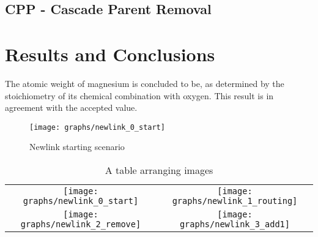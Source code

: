 \documentclass{article}
\begin{document}
\subsection{CPP - Cascade Parent Removal}


\section{Results and Conclusions}

The atomic weight of magnesium is concluded to be, as determined by the stoichiometry of its chemical combination with oxygen. This result is in agreement with the accepted value.

\begin{figure}[htbp]
\begin{center}
\texttt{[image: graphs/newlink\_0\_start]} %
\caption{Newlink starting scenario}
\end{center}
\end{figure}

\begin{table}[ht]
\caption{A table arranging  images}
\centering
\begin{tabular}{cc}
\texttt{[image: graphs/newlink\_0\_start]}&\texttt{[image: graphs/newlink\_1\_routing]}\\
 
\texttt{[image: graphs/newlink\_2\_remove]}&\texttt{[image: graphs/newlink\_3\_add1]}\\
\end{tabular}
\label{tab:gqwt}
\end{table}


\end{document}
